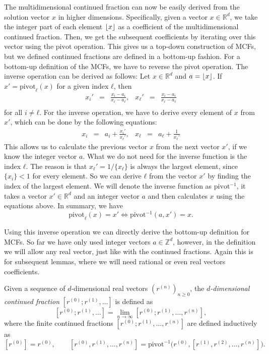 The multidimensional continued fraction can now be easily derived from the
solution vector $x$ in higher dimensions.
Specifically, given a vector $x ∈ ℝ^d$, we take the integer part of each
element $\left\lfloor x\right\rfloor$ as a coefficient of the multidimensional continued
fraction.
Then, we get the subsequent coefficients by iterating over this vector using
the $\mathrm{pivot}$ operation.
This gives us a top-down construction of MCFs, but we defined continued
fractions are defined in a bottom-up fashion.
For a bottom-up definition of the MCFs, we have to reverse the pivot operation.
The inverse operation can be derived as follows:
Let $x ∈ ℝ^d$ and $a = \left\lfloor x\right\rfloor$.
If $x' = \mathrm{pivot}_ℓ(x)$ for a given index $ℓ$, then
\[
  \begin{array}{lcrlcr}
    \displaystyle x_i' & = & \displaystyle \frac{x_i - a_i}{x_ℓ - a_ℓ}, &
    \displaystyle x_ℓ' & = & \displaystyle \frac{x_i - a_i}{x_ℓ - a_ℓ} \\[1em]
  \end{array}
\]
for all $i ≠ ℓ$.
For the inverse operation, we have to derive every element of $x$ from $x'$,
which can be done by the following equations:
\[
  \begin{array}{lcrlcr}
    \displaystyle x_i & = & a_i + \displaystyle \frac{x_i'}{x_ℓ'}, &
    \displaystyle x_ℓ & = & a_ℓ + \displaystyle \frac{1}{x_ℓ'}
  \end{array}
\]
This allows us to calculate the previous vector $x$ from the next vector $x'$,
if we know the integer vector $a$.
What we do not need for the inverse function is the index $ℓ$.
The reason is that $x_ℓ' = 1/\{x_ℓ\}$ is always the largest element,
since $\{x_i\} < 1$ for every element.
So we can derive $ℓ$ from the vector $x'$ by finding the index of the largest element.
We will denote the inverse function as $\mathrm{pivot}^{-1}$,
it takes a vector $x' ∈ ℝ^d$ and an integer vector $a$
and then calculates $x$ using the equations above.
In summary, we have
\[
  \mathrm{pivot}_ℓ(x) = x' \iff \mathrm{pivot}^{-1}(a, x') = x.
\]

Using this inverse operation we can directly derive the bottom-up definition for MCFs.
So far we have only used integer vectors $a ∈ ℤ^d$,
however, in the definition we will allow any real vector, just like with the continued fractions.
Again this is for subsequent lemmas, where we will need rational or even real vectors coefficients.

\begin{definition}
  Given a sequence of $d$-dimensional real vectors $(r^{(n)})_{n ≥ 0}$,
  the \emph{$d$-dimensional continued fraction} $[r^{(0)}; r^{(1)}, …]$ is defined as
  \[
    [r^{(0)}; r^{(1)}, …] = \lim_{n → ∞} [r^{(0)}; r^{(1)}, …, r^{(n)}],
  \]
  where the finite continued fractions $[r^{(0)}; r^{(1)}, …, r^{(n)}]$
  are defined inductively as
  \[
    [r^{(0)}] = r^{(0)},
    \qquad
    [r^{(0)}, r^{(1)}, …, r^{(n)}]
    = \mathrm{pivot}^{-1}\big(r^{(0)}, [r^{(1)}, r^{(2)}, …, r^{(n)}]\big).
  \]
\end{definition}

